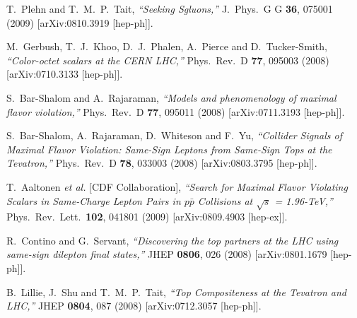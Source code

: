 \begin{thebibliography}{99}
  T.~Plehn and T.~M.~P.~Tait,
  {\it ``Seeking Sgluons,''}
  J.\ Phys.\ G G {\bf 36}, 075001 (2009)
  [arXiv:0810.3919 [hep-ph]].

  M.~Gerbush, T.~J.~Khoo, D.~J.~Phalen, A.~Pierce and D.~Tucker-Smith,
  {\it ``Color-octet scalars at the CERN LHC,''}
  Phys.\ Rev.\ D {\bf 77}, 095003 (2008)
  [arXiv:0710.3133 [hep-ph]].




  S.~Bar-Shalom and A.~Rajaraman,
  {\it ``Models and phenomenology of maximal flavor violation,''}
  Phys.\ Rev.\ D {\bf 77}, 095011 (2008)
  [arXiv:0711.3193 [hep-ph]].

  S.~Bar-Shalom, A.~Rajaraman, D.~Whiteson and F.~Yu,
  {\it ``Collider Signals of Maximal Flavor Violation: 
	Same-Sign Leptons from Same-Sign Tops at the Tevatron,''}
  Phys.\ Rev.\ D {\bf 78}, 033003 (2008)
  [arXiv:0803.3795 [hep-ph]].

  T.~Aaltonen {\it et al.}  [CDF Collaboration],
  {\it ``Search for Maximal Flavor Violating Scalars in 
	Same-Charge Lepton Pairs in $p \bar{p}$ Collisions at $\sqrt{s}$ = 1.96-TeV,''}
  Phys.\ Rev.\ Lett.\  {\bf 102}, 041801 (2009)
  [arXiv:0809.4903 [hep-ex]].


  R.~Contino and G.~Servant,
  {\it ``Discovering the top partners at the LHC using same-sign dilepton final states,''}
  JHEP {\bf 0806}, 026 (2008)
  [arXiv:0801.1679 [hep-ph]].


  B.~Lillie, J.~Shu and T.~M.~P.~Tait,
  {\it ``Top Compositeness at the Tevatron and LHC,''}
  JHEP {\bf 0804}, 087 (2008)
  [arXiv:0712.3057 [hep-ph]].



\end{thebibliography}
